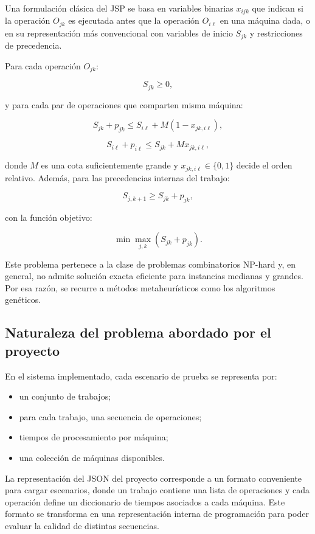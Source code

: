 \documentclass[11pt,a4paper]{article}
\begin{document}
Una formulación clásica del JSP se basa en variables binarias $x_{ijk}$ que indican si la operación $O_{jk}$ es ejecutada antes que la operación $O_{i\ell}$ en una máquina dada, o en su representación más convencional con variables de inicio $S_{jk}$ y restricciones de precedencia.

Para cada operación $O_{jk}$:

$$
S_{jk} \geq 0,
$$

y para cada par de operaciones que comparten misma máquina:

$$
S_{jk} + p_{jk} \leq S_{i\ell} + M (1 - x_{jk,i\ell}),
$$

$$
S_{i\ell} + p_{i\ell} \leq S_{jk} + M x_{jk,i\ell},
$$

donde $M$ es una cota suficientemente grande y $x_{jk,i\ell} \in \{0,1\}$ decide el orden relativo. Además, para las precedencias internas del trabajo:

$$
S_{j,k+1} \geq S_{jk} + p_{jk},
$$

con la función objetivo:

$$
\min \max_{j,k} (S_{jk} + p_{jk}).
$$

Este problema pertenece a la clase de problemas combinatorios NP-hard y, en general, no admite solución exacta eficiente para instancias medianas y grandes. Por esa razón, se recurre a métodos metaheurísticos como los algoritmos genéticos.

\subsection{Naturaleza del problema abordado por el proyecto}

En el sistema implementado, cada escenario de prueba se representa por:

\begin{itemize}
    \item un conjunto de trabajos;
    \item para cada trabajo, una secuencia de operaciones;
    \item tiempos de procesamiento por máquina;
    \item una colección de máquinas disponibles.
\end{itemize}

La representación del JSON del proyecto corresponde a un formato conveniente para cargar escenarios, donde un trabajo contiene una lista de operaciones y cada operación define un diccionario de tiempos asociados a cada máquina. Este formato se transforma en una representación interna de programación para poder evaluar la calidad de distintas secuencias.
\end{document}
